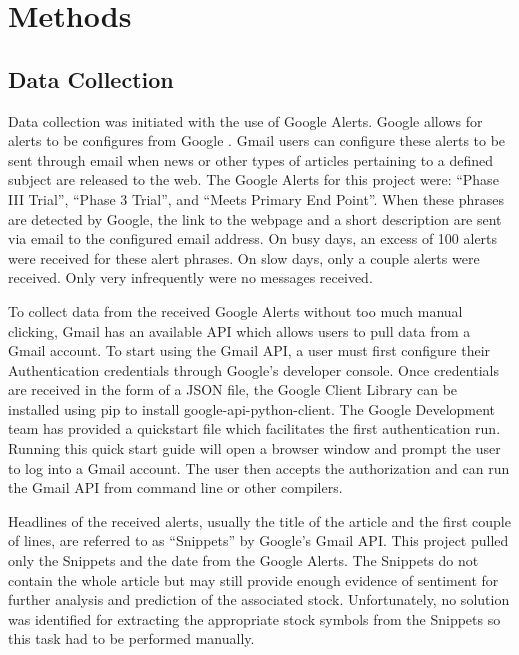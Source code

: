 \documentclass[sigconf]{acmart}
\begin{document}
\section{Methods}
\subsection{Data Collection}
Data collection was initiated with the use of Google Alerts. Google allows for alerts to be configures from Google \cite{www-googleAlerts}. Gmail users can configure these alerts to be sent through email when news or other types of articles pertaining to a defined subject are released to the web. The Google Alerts for this project were: ``Phase III Trial'', ``Phase 3 Trial'', and ``Meets Primary End Point''. When these phrases are detected by Google, the link to the webpage and a short description are sent via email to the configured email address. On busy days, an excess of 100 alerts were received for these alert phrases. On slow days, only a couple alerts were received.  Only very infrequently were no messages received. 

To collect data from the received Google Alerts without too much manual clicking, Gmail has an available API which allows users to pull data from a Gmail account. To start using the Gmail API, a user must first configure their Authentication credentials through Google's developer console. Once credentials are received in the form of a JSON file, the Google Client Library can be installed using pip to install google-api-python-client. The Google Development team has provided a quickstart file which facilitates the first authentication run. Running this quick start guide will open a browser window and prompt the user to log into a Gmail account. The user then accepts the authorization and can run the Gmail API from command line or other compilers. 

 Headlines of the received alerts, usually the title of the article and the first couple of lines, are referred to as ``Snippets'' by Google's Gmail API. This project pulled only the Snippets and the date from the Google Alerts. The Snippets do not contain the whole article but may still provide enough evidence of sentiment for further analysis and prediction of the associated stock. Unfortunately, no solution was identified for extracting the appropriate stock symbols from the Snippets so this task had to be performed manually. 
\end{document}
